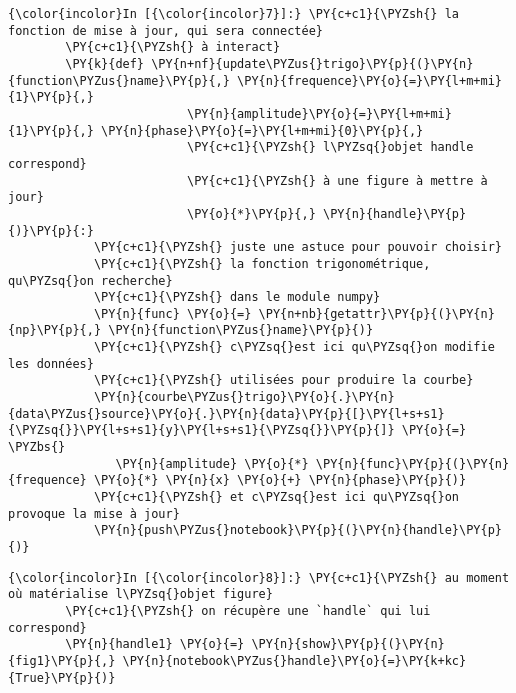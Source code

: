     \begin{Verbatim}[commandchars=\\\{\},frame=single,framerule=0.3mm,rulecolor=\color{cellframecolor}]
{\color{incolor}In [{\color{incolor}7}]:} \PY{c+c1}{\PYZsh{} la fonction de mise à jour, qui sera connectée}
        \PY{c+c1}{\PYZsh{} à interact}
        \PY{k}{def} \PY{n+nf}{update\PYZus{}trigo}\PY{p}{(}\PY{n}{function\PYZus{}name}\PY{p}{,} \PY{n}{frequence}\PY{o}{=}\PY{l+m+mi}{1}\PY{p}{,}
                         \PY{n}{amplitude}\PY{o}{=}\PY{l+m+mi}{1}\PY{p}{,} \PY{n}{phase}\PY{o}{=}\PY{l+m+mi}{0}\PY{p}{,}
                         \PY{c+c1}{\PYZsh{} l\PYZsq{}objet handle correspond}
                         \PY{c+c1}{\PYZsh{} à une figure à mettre à jour}
                         \PY{o}{*}\PY{p}{,} \PY{n}{handle}\PY{p}{)}\PY{p}{:}
            \PY{c+c1}{\PYZsh{} juste une astuce pour pouvoir choisir}
            \PY{c+c1}{\PYZsh{} la fonction trigonométrique, qu\PYZsq{}on recherche}
            \PY{c+c1}{\PYZsh{} dans le module numpy}
            \PY{n}{func} \PY{o}{=} \PY{n+nb}{getattr}\PY{p}{(}\PY{n}{np}\PY{p}{,} \PY{n}{function\PYZus{}name}\PY{p}{)}
            \PY{c+c1}{\PYZsh{} c\PYZsq{}est ici qu\PYZsq{}on modifie les données}
            \PY{c+c1}{\PYZsh{} utilisées pour produire la courbe}
            \PY{n}{courbe\PYZus{}trigo}\PY{o}{.}\PY{n}{data\PYZus{}source}\PY{o}{.}\PY{n}{data}\PY{p}{[}\PY{l+s+s1}{\PYZsq{}}\PY{l+s+s1}{y}\PY{l+s+s1}{\PYZsq{}}\PY{p}{]} \PY{o}{=} \PYZbs{}
               \PY{n}{amplitude} \PY{o}{*} \PY{n}{func}\PY{p}{(}\PY{n}{frequence} \PY{o}{*} \PY{n}{x} \PY{o}{+} \PY{n}{phase}\PY{p}{)}
            \PY{c+c1}{\PYZsh{} et c\PYZsq{}est ici qu\PYZsq{}on provoque la mise à jour}
            \PY{n}{push\PYZus{}notebook}\PY{p}{(}\PY{n}{handle}\PY{p}{)}
\end{Verbatim}


    \begin{Verbatim}[commandchars=\\\{\},frame=single,framerule=0.3mm,rulecolor=\color{cellframecolor}]
{\color{incolor}In [{\color{incolor}8}]:} \PY{c+c1}{\PYZsh{} au moment où matérialise l\PYZsq{}objet figure}
        \PY{c+c1}{\PYZsh{} on récupère une `handle` qui lui correspond}
        \PY{n}{handle1} \PY{o}{=} \PY{n}{show}\PY{p}{(}\PY{n}{fig1}\PY{p}{,} \PY{n}{notebook\PYZus{}handle}\PY{o}{=}\PY{k+kc}{True}\PY{p}{)}
\end{Verbatim}


    
    
    
    
